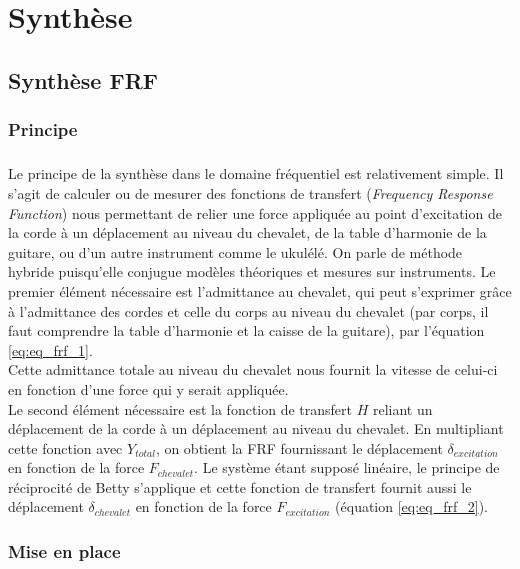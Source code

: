 \chapter{Synthèse}
\section{Synthèse FRF}

\subsection{Principe}
\paragraph*{} 

Le principe de la synthèse dans le domaine fréquentiel est relativement simple.
Il s'agit de calculer ou de mesurer des fonctions de transfert
(\textit{Frequency Response Function}) nous permettant de relier une force
appliquée au point d'excitation de la corde à un déplacement au niveau du
chevalet, de la table d'harmonie de la guitare, ou d'un autre instrument comme le ukulélé. On parle de méthode hybride puisqu'elle conjugue modèles théoriques et mesures sur instruments. Le premier élément nécessaire est l'admittance au chevalet, qui peut s'exprimer grâce à l'admittance des cordes et celle du corps au niveau du chevalet (par corps, il faut comprendre la table d'harmonie et la caisse de la guitare), par l'équation \ref{eq:eq_frf_1}.\\

Cette admittance totale au niveau du chevalet nous fournit la vitesse de
celui-ci en fonction d'une force qui y serait appliquée. \\

Le second élément nécessaire est la fonction de transfert $H$ reliant un
déplacement de la corde à un déplacement au niveau du chevalet. En multipliant cette fonction avec $Y_{total}$, on obtient la FRF fournissant le déplacement $\delta_{excitation}$ en fonction de la force $F_{chevalet}$. Le système étant supposé linéaire, le principe de réciprocité de Betty s'applique et cette fonction de transfert fournit aussi le déplacement $\delta_{chevalet}$ en fonction de la force $F_{excitation}$ (équation \ref{eq:eq_frf_2}).


\subsection{Mise en place}
